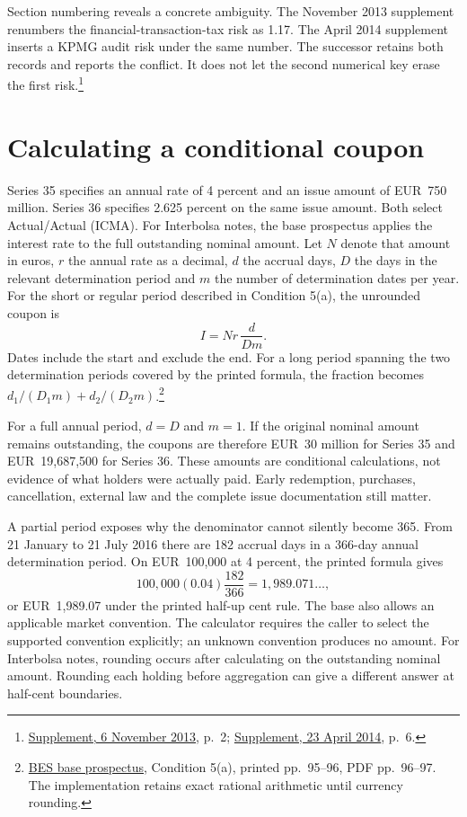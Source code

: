 \documentclass[11pt,a4paper]{article}
\begin{document}
Section numbering reveals a concrete ambiguity. The November 2013 supplement
renumbers the financial-transaction-tax risk as 1.17. The April 2014 supplement
inserts a KPMG audit risk under the same number. The successor retains both
records and reports the conflict. It does not let the second numerical key erase
the first risk.\footnote{\href{../../prospectus/corner-cases-2026-10-04/sources/jur-more-bes-1843910/source.pdf}{Supplement, 6 November 2013}, p.~2; \href{../../prospectus/corner-cases-2026-10-04/sources/jur-more-bes-2001058/source.pdf}{Supplement, 23 April 2014}, p.~6.}

\section*{Calculating a conditional coupon}

Series 35 specifies an annual rate of 4 percent and an issue amount of
EUR~750 million. Series 36 specifies 2.625 percent on the same issue amount.
Both select Actual/Actual (ICMA). For Interbolsa notes, the base prospectus
applies the interest rate to the full outstanding nominal amount. Let \(N\)
denote that amount in euros, \(r\) the annual rate as a decimal, \(d\) the
accrual days, \(D\) the days in the relevant determination period and \(m\)
the number of determination dates per year. For the short or regular period
described in Condition 5(a), the unrounded coupon is
\[
 I=Nr\,\frac{d}{Dm}.
\]
Dates include the start and exclude the end. For a long period spanning the
two determination periods covered by the printed formula, the fraction becomes
\(d_1/(D_1m)+d_2/(D_2m)\).\footnote{\href{../../prospectus/corner-cases-2026-10-04/sources/jur-more-bes-1774077/source.pdf}{BES base prospectus}, Condition 5(a), printed pp.~95--96, PDF pp.~96--97. The implementation retains exact rational arithmetic until currency rounding.}

For a full annual period, \(d=D\) and \(m=1\). If the original nominal amount
remains outstanding, the coupons are therefore EUR~30 million for Series 35
and EUR~19,687,500 for Series 36. These amounts are conditional calculations,
not evidence of what holders were actually paid. Early redemption, purchases,
cancellation, external law and the complete issue documentation still matter.

A partial period exposes why the denominator cannot silently become 365.
From 21 January to 21 July 2016 there are 182 accrual days in a 366-day annual
determination period. On EUR~100,000 at 4 percent, the printed formula gives
\[
 100{,}000(0.04)\frac{182}{366}=1{,}989.071\ldots,
\]
or EUR~1,989.07 under the printed half-up cent rule. The base also allows an
applicable market convention. The calculator requires the caller to select
the supported convention explicitly; an unknown convention produces no amount.
For Interbolsa notes, rounding occurs after calculating on the outstanding
nominal amount. Rounding each holding before aggregation can give a different
answer at half-cent boundaries.
\end{document}
